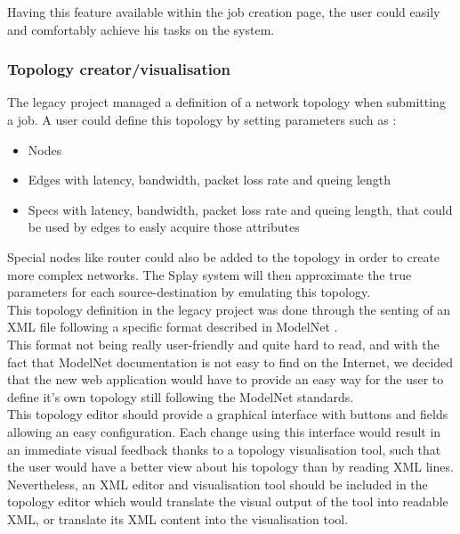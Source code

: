 \documentclass{eplmastersthesis}
\begin{document}
          Having this feature available within the job creation page, the user
          could easily and comfortably achieve his tasks on the system.

        \subsubsection{Topology creator/visualisation}

          The legacy project managed a definition of a network topology when
          submitting a job. A user could define this topology by setting
          parameters such as :

          \begin{itemize}
            \item Nodes
            \item Edges with latency, bandwidth, packet loss rate and queing
            length
            \item Specs with latency, bandwidth, packet loss rate and queing
            length, that could be used by edges to easly acquire those
            attributes
          \end{itemize}

          Special nodes like router could also be added to the topology in order
          to create more complex networks. The Splay system will then
          approximate the true parameters for each source-destination by
          emulating this topology.\\

          This topology definition in the legacy project was done through
          the senting of an XML file following a specific format described
          in ModelNet \cite{ModelNet}.\\
          This format not being really user-friendly and quite hard to read,
          and with the fact that ModelNet documentation is not easy to find
          on the Internet, we decided that the new web application would have
          to provide an easy way for the user to define it's own topology
          still following the ModelNet standards.\\

          This topology editor should provide a graphical interface with
          buttons and fields allowing an easy configuration. Each change
          using this interface would result in an immediate visual feedback
          thanks to a topology visualisation tool, such that the user would
          have a better view about his topology than by reading XML lines.
          Nevertheless, an XML editor and visualisation tool should be included
          in the topology editor which would translate the visual output of
          the tool into readable XML, or translate its XML content into the
          visualisation tool.\\
\end{document}
